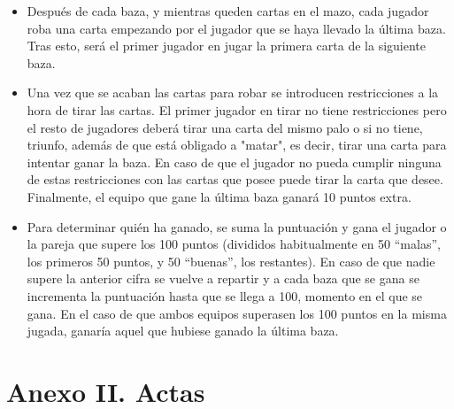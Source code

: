 \documentclass[]{article}
\begin{document}
\begin{description}
\begin{itemize}
\item{Después de cada baza, y mientras queden cartas en el mazo, cada jugador roba una carta empezando por el jugador que se haya llevado la última baza. Tras esto, será el primer jugador en jugar la primera carta de la siguiente baza.}
\item{Una vez que se acaban las cartas para robar se introducen restricciones a la hora de tirar las cartas. El primer jugador en tirar no tiene restricciones pero el resto de jugadores deberá tirar una carta del mismo palo o si no tiene, triunfo, además de que está obligado a "matar", es decir, tirar una carta para intentar ganar la baza. En caso de que el jugador no pueda cumplir ninguna de estas restricciones con las cartas que posee puede tirar la carta que desee. Finalmente, el equipo que gane la última baza ganará 10 puntos extra.}
\item{Para determinar quién ha ganado, se suma la puntuación y gana el jugador o la pareja que supere los 100 puntos (divididos habitualmente en 50 “malas”, los primeros 50 puntos, y 50 “buenas”, los restantes). En caso de que nadie supere la anterior cifra se vuelve a repartir y a cada baza que se gana se incrementa la puntuación hasta que se llega a 100, momento en el que se gana. En el caso de que ambos equipos superasen los 100 puntos en la misma jugada, ganaría aquel que hubiese ganado la última baza.}
\end{itemize}
\end{description}
\clearpage
\section*{Anexo II. Actas}
\label{an2}





\clearpage
\end{document}
